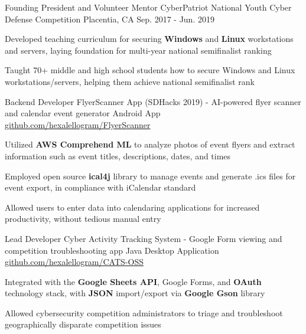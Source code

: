 \begin{cventries}
  \cventry
    {Founding President and Volunteer Mentor} %
    {CyberPatriot National Youth Cyber Defense Competition} %
    {Placentia, CA} %
    {Sep. 2017 - Jun. 2019} %
    {
      \begin{cvitems} %
        \item {Developed teaching curriculum for securing \textbf{Windows} and \textbf{Linux} workstations and servers, laying foundation for multi-year national semifinalist ranking}
        \item {Taught 70+ middle and high school students how to secure Windows and Linux workstations/servers, helping them achieve national semifinalist rank}
      \end{cvitems}
    }

\cventry
{Backend Developer} %
{FlyerScanner App (SDHacks 2019) - AI-powered flyer scanner and calendar event generator} %
{Android App} %
{\href{https://github.com/hexalellogram/FlyerScanner}{github.com/hexalellogram/FlyerScanner}} %
{
  \begin{cvitems} %
    \item {Utilized \textbf{AWS Comprehend ML} to analyze photos of event flyers and extract information such as event titles, descriptions, dates, and times}
    \item {Employed open source \textbf{ical4j} library to manage events and generate .ics files for event export, in compliance with iCalendar standard}
    \item {Allowed users to enter data into calendaring applications for increased productivity, without tedious manual entry}
  \end{cvitems}
}

\cventry
{Lead Developer} %
{Cyber Activity Tracking System - Google Form viewing and competition troubleshooting app} %
{Java Desktop Application} %
{\href{https://github.com/hexalellogram/CATS-OSS}{github.com/hexalellogram/CATS-OSS}} %
{
  \begin{cvitems} %
    \item {Integrated with the \textbf{Google Sheets API}, Google Forms, and \textbf{OAuth} technology stack, with \textbf{JSON} import/export via \textbf{Google Gson} library}
    \item {Allowed cybersecurity competition administrators to triage and troubleshoot geographically disparate competition issues}
  \end{cvitems}
}

\end{cventries}
